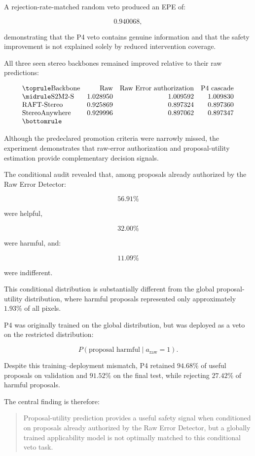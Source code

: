 \documentclass[11pt,a4paper]{article}
\begin{document}
A rejection-rate-matched random veto produced an EPE of:

\[
0.940068,
\]

demonstrating that the P4 veto contains genuine information and that the safety improvement is not explained solely by reduced intervention coverage.

All three seen stereo backbones remained improved relative to their raw predictions:

\[
\begin{array}{lrrr}
\toprule
\text{Backbone}
&
\text{Raw}
&
\text{Raw Error authorization}
&
\text{P4 cascade}
\\
\midrule
\text{S2M2-S}
& 1.028950 & 1.009592 & 1.009830
\\
\text{RAFT-Stereo}
& 0.925869 & 0.897324 & 0.897360
\\
\text{StereoAnywhere}
& 0.929996 & 0.897062 & 0.897347
\\
\bottomrule
\end{array}
\]

Although the predeclared promotion criteria were narrowly missed, the experiment demonstrates that raw-error authorization and proposal-utility estimation provide complementary decision signals.

The conditional audit revealed that, among proposals already authorized by the Raw Error Detector:

\[
56.91\%
\]

were helpful,

\[
32.00\%
\]

were harmful, and:

\[
11.09\%
\]

were indifferent.

This conditional distribution is substantially different from the global proposal-utility distribution, where harmful proposals represented only approximately \(1.93\%\) of all pixels.

P4 was originally trained on the global distribution, but was deployed as a veto on the restricted distribution:

\[
P
\left(
\text{proposal harmful}
\mid
a_{\mathrm{raw}}=1
\right).
\]

Despite this training--deployment mismatch, P4 retained \(94.68\%\) of useful proposals on validation and \(91.52\%\) on the final test, while rejecting \(27.42\%\) of harmful proposals.

The central finding is therefore:

\begin{quote}
Proposal-utility prediction provides a useful safety signal when conditioned on proposals already authorized by the Raw Error Detector, but a globally trained applicability model is not optimally matched to this conditional veto task.
\end{quote}
\end{document}
